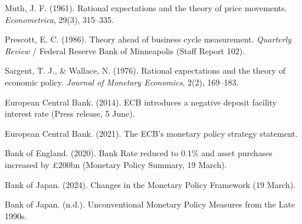 \documentclass[
  letterpaper,
  DIV=11,
  numbers=noendperiod]{scrartcl}
\begin{document}
Muth, J. F. (1961). Rational expectations and the theory of price
movements. \emph{Econometrica}, 29(3), 315--335.

Prescott, E. C. (1986). Theory ahead of business cycle measurement.
\emph{Quarterly Review} / Federal Reserve Bank of Minneapolis (Staff
Report 102).

Sargent, T. J., \& Wallace, N. (1976). Rational expectations and the
theory of economic policy. \emph{Journal of Monetary Economics}, 2(2),
169--183.

European Central Bank. (2014). ECB introduces a negative deposit
facility interest rate (Press release, 5 June).

European Central Bank. (2021). The ECB's monetary policy strategy
statement.

Bank of England. (2020). Bank Rate reduced to 0.1\% and asset purchases
increased by £200bn (Monetary Policy Summary, 19 March).

Bank of Japan. (2024). Changes in the Monetary Policy Framework (19
March).

Bank of Japan. (n.d.). Unconventional Monetary Policy Measures from the
Late 1990s.
\end{document}

